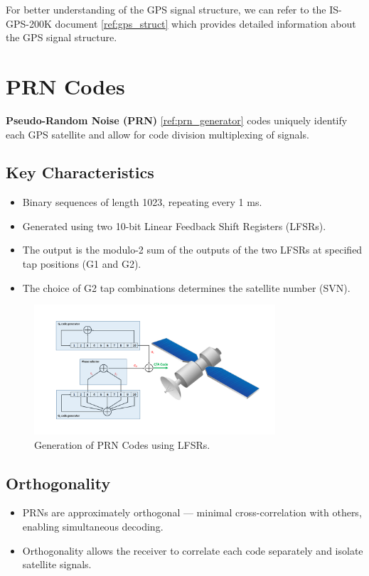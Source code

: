 \documentclass[12pt]{report}
\begin{document}
For better understanding of the GPS signal structure, we can refer to the IS-GPS-200K document \ref{ref:gps_struct} which provides detailed information about the GPS signal structure.

\section{PRN Codes}
\textbf{Pseudo-Random Noise (PRN)} \ref{ref:prn_generator} codes uniquely identify each GPS satellite and allow for code division multiplexing of signals.

\subsection{Key Characteristics}
\begin{itemize}
  \item Binary sequences of length 1023, repeating every 1 ms.
  \item Generated using two 10-bit Linear Feedback Shift Registers (LFSRs).
  \item The output is the modulo-2 sum of the outputs of the two LFSRs at specified tap positions (G1 and G2).
  \item The choice of G2 tap combinations determines the satellite number (SVN).
\end{itemize}

\begin{figure}[H]
    \centering
    \includegraphics[width=0.8\textwidth]{PRN_gen.png}
    \caption{Generation of PRN Codes using LFSRs.}
    \label{fig:prn_gen}
\end{figure}

\subsection{Orthogonality}
\begin{itemize}
  \item PRNs are approximately orthogonal — minimal cross-correlation with others, enabling simultaneous decoding.
  \item Orthogonality allows the receiver to correlate each code separately and isolate satellite signals.
\end{itemize}
\end{document}
